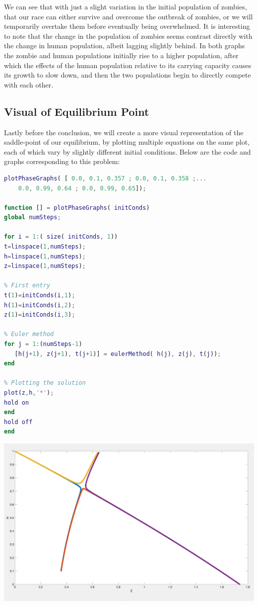 \documentclass[11pt]{article}
\begin{document}
We can see that with just a slight variation in the initial population of zombies, that our race can either survive and overcome the outbreak of zombies, or we will temporarily overtake them before eventually being overwhelmed. It is interesting to note that the change in the population of zombies seems contrast directly with the change in human population, albeit lagging slightly behind. In both graphs the zombie and human populations initially rise to a higher population, after which the effects of the human population relative to its carrying capacity causes its growth to slow down, and then the two populations begin to directly compete with each other.

\subsection{ Visual of Equilibrium Point}
Lastly before the conclusion, we will create a more visual representation of the saddle-point of our equilibrium, by plotting multiple equations on the same plot, each of which vary by slightly different initial conditions. Below are the code and graphs corresponding to this problem:

\begin{lstlisting}[language = Matlab]
plotPhaseGraphs( [ 0.0, 0.1, 0.357 ; 0.0, 0.1, 0.358 ;...
    0.0, 0.99, 0.64 ; 0.0, 0.99, 0.65]);

function [] = plotPhaseGraphs( initConds)
global numSteps;

for i = 1:( size( initConds, 1))
t=linspace(1,numSteps);
h=linspace(1,numSteps);
z=linspace(1,numSteps);

% First entry
t(1)=initConds(i,1);
h(1)=initConds(i,2);
z(1)=initConds(i,3);

% Euler method
for j = 1:(numSteps-1)
   [h(j+1), z(j+1), t(j+1)] = eulerMethod( h(j), z(j), t(j));
end

% Plotting the solution
plot(z,h,'*');
hold on
end
hold off
end
\end{lstlisting}

\includegraphics[scale = 0.32]{Q9.png}
\end{document}
